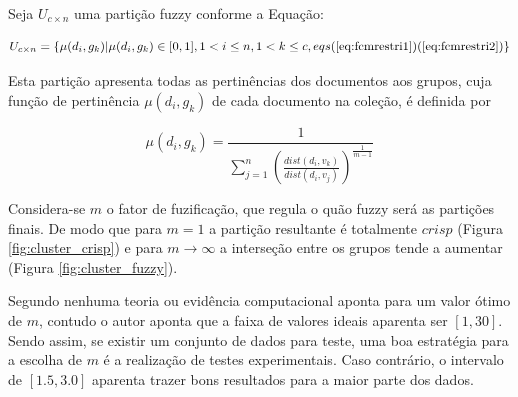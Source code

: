 Seja $U_{c \times n}$ uma partição fuzzy conforme a Equação:

\begin{equation} 
  U_{c \times n} = \{\mu(d_i, g_k) |\mu(d_i, g_k) \in [0,1], 1 < i \leq n, 1 < k \leq c, eqs
  (\ref{eq:fcmrestri1})(\ref{eq:fcmrestri2})\} 
  \label{eq:part_fuzzy} 
\end{equation} 

Esta partição apresenta todas as pertinências dos documentos aos grupos, cuja função de pertinência $\mu(d_i,g_k)$ de cada documento na coleção, é definida por 

\begin{equation} 
  \mu(d_i,g_k) = \frac{1}{\sum_{j=1}^n(\frac{dist(d_i,v_k)}{dist(d_i,v_j)})^{\frac{1}{m-1}}} 
  \label{eq:pertinencia}
\end{equation}


Considera-se $m$ o fator de fuzificação, que regula o quão fuzzy será as partições finais. De modo que para $m = 1$ a partição resultante é totalmente $crisp$ (Figura \ref{fig:cluster_crisp}) e para $m \rightarrow \infty$ a interseção entre os grupos tende a aumentar (Figura \ref{fig:cluster_fuzzy})\cite{Pal2005}. 

Segundo \cite{Bezdek1984} nenhuma teoria ou evidência computacional aponta para um valor ótimo de $m$, contudo o autor aponta que a faixa de valores ideais aparenta ser $[1,30]$. Sendo assim, se existir um conjunto de dados para teste, uma boa estratégia para a escolha de $m$ é a realização de testes experimentais. Caso contrário, o intervalo de $[1.5, 3.0]$ aparenta trazer bons resultados para a maior parte dos dados.

